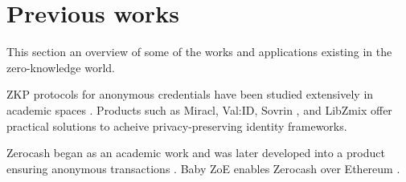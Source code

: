 \section{Previous works}
\label{apps:previous-works}

This section  an overview of some of the works and applications existing in the zero-knowledge world. 


ZKP protocols for anonymous credentials have been studied extensively in academic spaces \cite{2010:SCN:Solving-Revocation-with-Efficient-Update-of-Anonymous-Credentials,2014:architecture-for-ABC-technologies,2017:ccs:Practical-UC-Secure-Delegatable-Credentials-with-attributes,2017:SP:Accumulators-with-Applications-to-Anonymity-Preserving-Revocation,2018:NSDI:zkLedger}.  Products such as Miracl, Val:ID, Sovrin \cite{2018:sovrin}, and LibZmix \cite{2019:github:libzmix} offer practical solutions to acheive privacy-preserving identity frameworks.  

Zerocash began as an academic work and was later developed into a product ensuring anonymous transactions \cite{2014:SP:Zerocash}. Baby ZoE enables Zerocash over Ethereum \cite{2018:github:baby-zoe}.

